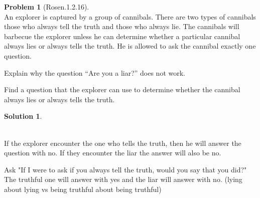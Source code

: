 \documentclass{article}
\theoremstyle{definition}
\newtheorem*{problem}{Problem}
\newtheorem*{solution}{Solution}
\begin{document}
\begin{problem}[Rosen.1.2.16]\ \\
An explorer is captured by a group of cannibals. There are
two types of cannibals those who always tell the truth
and those who always lie. The cannibals will barbecue
the explorer unless he can determine whether a particular
cannibal always lies or always tells the truth. He is
allowed to ask the cannibal exactly one question.
\begin{compactenum}
\renewcommand{\theenumi}{\alph{enumi}}
\item Explain why the question “Are you a liar?” does not
work.
\item Find a question that the explorer can use to determine
whether the cannibal always lies or always tells the
truth.
\end{compactenum}
\end{problem}

\begin{solution}\ \\
\ \\
\begin{compactenum}
\renewcommand{\theenumi}{\alph{enumi}}
\item If the explorer encounter the one who tells the truth, then he will answer the question with no. If they encounter the liar the answer will also be no. 
\ \\
\item Ask "If I were to ask if you always tell the truth, would you say that you did?"\ \\
The truthful one will answer with yes and the liar will answer with no. (lying about lying vs being truthful about being truthful)\ \\
\ \\

\end{compactenum}
\end{solution}
\end{document}
